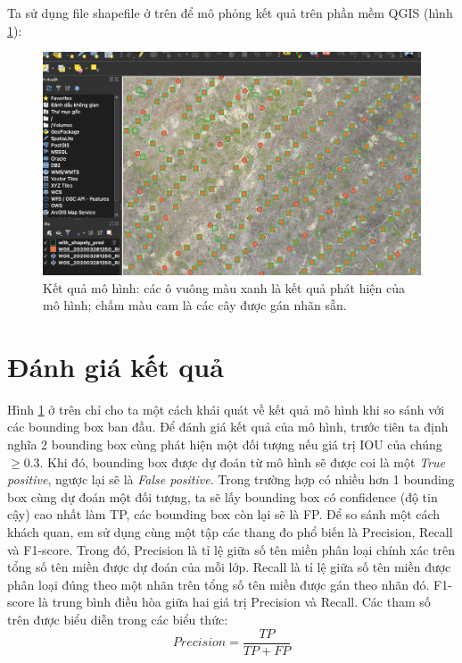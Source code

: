 \documentclass[a4paper, 12pt]{report}
\begin{document}
Ta sử dụng file shapefile ở trên để mô phỏng kết quả trên phần mềm QGIS (hình \ref{fig:demo_result}): 
 \begin{figure}[!h]
	\centering
	\includegraphics[width=1\linewidth]{Images/demo_result}
	\caption{Kết quả mô hình: các ô vuông màu xanh là kết quả phát hiện của mô hình; chấm màu cam là các cây được gán nhãn sẵn. }
	\label{fig:demo_result}
\end{figure}


\section{Đánh giá kết quả}
Hình \ref{fig:demo_result} ở trên chỉ cho ta một cách khái quát về kết quả mô hình khi so sánh với các bounding box ban đầu.  Để đánh giá kết quả của mô hình,  trước tiên ta định nghĩa 2 bounding box cùng phát hiện một đối tượng nếu giá trị IOU của chúng $\geq 0.3$. Khi đó,  bounding box được dự đoán từ mô hình sẽ được coi là một \textit{True positive},  ngược lại sẽ là \textit{False positive}.  Trong trường hợp có nhiều hơn 1 bounding box cùng dự đoán một đối tượng,  ta sẽ lấy bounding box có confidence (độ tin cậy) cao nhất làm TP, các bounding box còn lại sẽ là FP.  Để so sánh một cách khách quan, em sử dụng cùng một tập các thang đo phổ biến là Precision, Recall và F1-score.  Trong đó, Precision là tỉ lệ giữa số tên miền phân loại chính xác trên tổng số tên miền được dự đoán của mỗi lớp. Recall là tỉ lệ giữa số tên miền được
phân loại đúng theo một nhãn trên tổng số tên miền được gán theo nhãn đó.
F1-score là trung bình điều hòa giữa hai giá trị Precision và Recall. Các tham
số trên được biểu diễn trong các biểu thức:
\begin{equation*}
	Precision = \frac{TP}{TP + FP}
\end{equation*}
\end{document}
